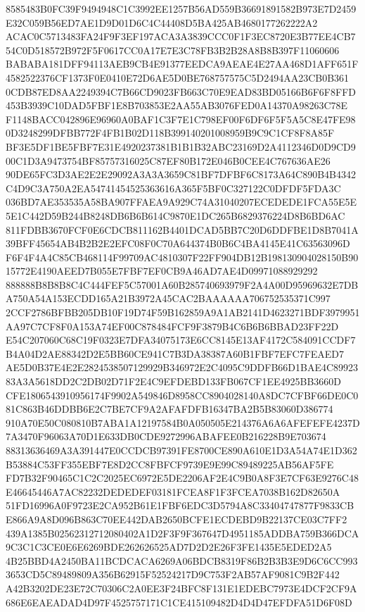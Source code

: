 \documentclass[UTF8,fontset=fandol,zihao=-4,a4paper]{ctexart}
\begin{document}
{{8585483B0FC39F9494948C1C3992EE1257B56AD559B36691891582B973E7D2459E32C059B56ED7AE1D9D01D6C4C44408D5BA425AB4680177262222A2
ACAC0C5713483FA24F9F3EF197ACA3A3839CCC0F1F3EC8720E3B77EE4CB754C0D518572B972F5F0617CC0A17E7E3C78FB3B2B28A8B8B397F11060606
BABABA181DFF94113AEB9CB4E91377EEDCA9AEAE4E27AA468D1AFF651F4582522376CF1373F0E0410E72D6AE5D0BE768757575C5D2494AA23CB0B361
0CDB87ED8AA2249394C7B66CD9023FB663C70E9EAD83BD05166B6F6F8FFD453B3939C10DAD5FBF1E8B703853E2AA55AB3076FED0A14370A98263C78E
F1148BACC042896E96960A0BAF1C3F7E1C798EF00F6DF6F5F5A5C8E47FE980D3248299DFBB772F4FB1B02D118B399140201008959B9C9C1CF8F8A85F
BF3E5DF1BE5FBF7E31E4920237381B1B1B32ABC23169D2A4112346D0D9CD900C1D3A9473754BF85757316025C87EF80B172E046B0CEE4C767636AE26
90DE65FC3D3AE2E2E29092A3A3A3659C81BF7DFBF6C8173A64C890B4B4342C4D9C3A750A2EA54741454525363616A365F5BF0C327122C0DFDF5FDA3C
036BD7AE353535A58BA907FFAEA9A929C74A31040207ECEDEDE1FCA55E5E5E1C442D59B244B8248DB6B6B614C9870E1DC265B6829376224D8B6BD6AC
811FDBB3670FCF0E6CDCB811162B4401DCAD5BB7C20D6DDFBE1D8B7041A39BFF45654AB4B2B2E2EFC08F0C70A644374B0B6C4BA4145E41C63563096D
F6F4F4A4C85CB468114F99709AC4810307F22FF904DB12B198130904028150B9015772E4190AEED7B055E7FBF7EF0CB9A46AD7AE4D09971088929292
888888B8B8B8C4C444FEF5C57001A60B285740693979F2A4A00D95969632E7DBA750A54A153ECDD165A21B3972A45CAC2BAAAAAA706752535371C997
2CCF2786BFBB205DB10F19D74F59B162859A9A1AB2141D4623271BDF3979951AA97C7CF8F0A153A74EF00C878484FCF9F3879B4C6B6B6BBAD23FF22D
E54C207060C68C19F0323E7DFA34075173E6CC8145E13AF4172C584091CCDF7B4A04D2AE88342D2E5BB60CE941C7B3DA38387A60B1FBF7EFC7FEAED7
AE5D0B37E4E2E2824538507129929B346972E2C4095C9DDFB66D1BAE4C8992383A3A5618DD2C2DB02D71F2E4C9EFDEBD133FB067CF1EE4925BB3660D
CFE1806543910956174F9902A549846D8958CC8904028140A8DC7CFBF66DE0C081C863B46DDBB6E2C7BE7CF9A2AFAFDFB16347BA2B5B83060D386774
910A70E50C080810B7ABA1A12197584B0A050505E214376A6A6AFEFEFE4237D7A3470F96063A70D1E633DB0CDE9272996ABAFEE0B216228B9E703674
88313636469A3A391447E0CCDCB97391FE8700CE890A610E1D3A54A74E1D362B53884C53FF355EBF7E8D2CC8FBFCF9739E9E99C89489225AB56AF5FE
FD7B32F90465C1C2C2025EC6972E5DE2206AF2E4C9B0A8F3E7CF63E9276C48E46645446A7AC82232DEDEDEF03181FCEA8F1F3FCEA7038B162D82650A
51FD16996A0F9723E2CA952B61E1FBF6EDC3D5794A8C33404747877F9833CBE866A9A8D096B863C70EE442DAB2650BCFE1ECDEBD9B22137CE03C7FF2
439A1385B02562312712080402A1D2F3F9F367647D4951185ADDBA759B366DCA9C3C1C3CE0E6E6269BDE262626525AD7D2D2E26F3FE1435E5EDED2A5
4B25BBD4A2450BA11BCDCACA6269A06BDCB8319F86B2B3B3E9D6C6CC9933653CD5C89489809A356B62915F52524217D9C753F2AB57AF9081C9B2F442
A42B3202DE23E72C70306C2A0EE3F24BFC8F131E1EDEBC7973E4DCF2CF9A686E6EAEADAD4D97F4525757171C1CE415109482D4D4D47EFDFA51D6F08D
}}
\end{document}
